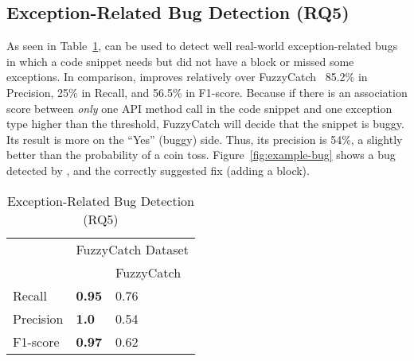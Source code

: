 \subsection{Exception-Related Bug Detection (RQ5)}
\label{sec:rq1}





As seen in Table~\ref{tab:bug}, {\tool} can be used to detect well
real-world exception-related bugs in which a code snippet needs but
did not have a  block or missed some exceptions. In
comparison, {\tool} improves relatively over
FuzzyCatch~\cite{xrank-fse20} 85.2\% in Precision, 25\% in Recall, and
56.5\% in F1-score.
Because if there is an association score between {\em only} one API
method call in the code snippet and one exception type higher than the
threshold, FuzzyCatch will decide that the snippet is buggy. Its
result is more on the ``Yes'' (buggy) side. Thus, its precision is
54\%, a slightly better than the probability of a coin
toss. Figure~\ref{fig:example-bug} shows a bug detected by {\tool},
and the correctly suggested fix (adding a  block).


\begin{table}[t]%
  \caption {Exception-Related Bug Detection (RQ5)}
  \vspace{-12pt}
  \small
	\begin{center}
		\renewcommand{\arraystretch}{1}
		\begin{tabular}{|p{1.75cm}<{\centering}|p{1.75cm}<{\centering}|p{1.75cm}<{\centering}|}
		  \hline
			\multirow{2}{*}{} & \multicolumn{2}{c|}{FuzzyCatch Dataset} \\
			\cline{2-3}
			  & \tool  & FuzzyCatch~\cite{xrank-fse20} \\
			\hline
			Recall    & \textbf{0.95}& 0.76\\
			Precision & \textbf{1.0} & 0.54\\
			F1-score   & \textbf{0.97} & 0.62\\
			\hline
		\end{tabular}
		\label{tab:bug}
	\end{center}
\end{table}

%


